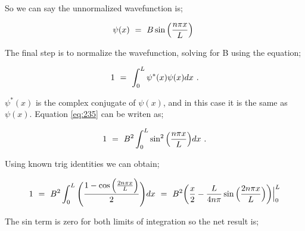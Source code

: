 \documentclass{article}
\begin{document}
So we can say the unnormalized wavefunction is;

\begin{equation} \label{eq:234}
\psi(x) \hspace{0.125cm} = \hspace{0.125cm} B\sin\Big(\frac{n\pi x}{L}\Big) \hspace{0.125cm}
\end{equation}

The final step is to normalize the wavefunction, solving for B using the equation; 

\begin{equation} \label{eq:235}
1 \hspace{0.125cm} = \hspace{0.125cm} \int_{0}^{L} \psi^{\ast}(x)\psi(x) dx \hspace{0.125cm} .
\end{equation}

\begin{math} \psi^{\ast}(x) \end{math} is the complex conjugate of \begin{math} \psi(x) \end{math}, and in this case it is the same as \begin{math} \psi(x) \end{math}. Equation \ref{eq:235} can be writen as; 

\begin{equation} \label{eq:236}
1 \hspace{0.125cm} = \hspace{0.125cm} B^2 \int_{0}^{L} \sin^{2}\Big(\frac{n\pi x}{L}\Big) dx \hspace{0.125cm} .  
\end{equation}

Using known trig identities we can obtain;

\begin{equation} \label{eq:237}
1 \hspace{0.125cm} = \hspace{0.125cm} B^2 \int_{0}^{L} \Bigg( \frac{1 - \cos\Big({\frac{2n\pi x}{L}\Big)}}{2} \Bigg) dx \hspace{0.125cm} = \hspace{0.125cm} B^2 \bigg( \frac{x}{2} - \frac{L}{4n\pi}\sin\Big({\frac{2n\pi x}{L}\Big)} \bigg) \Big|_0^L 
\end{equation}

The sin term is zero for both limits of integration so the net result is; 
\end{document}
